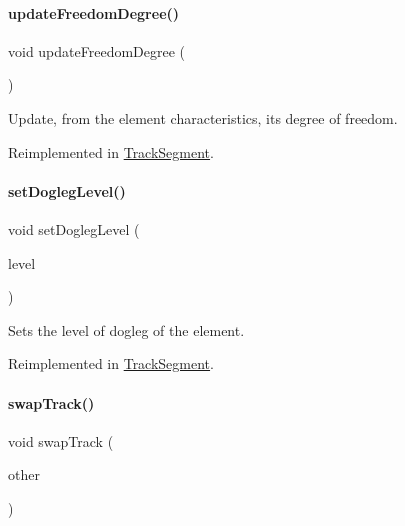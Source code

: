 \paragraph{\texorpdfstring{update\+Freedom\+Degree()}{updateFreedomDegree()}}
{\footnotesize\ttfamily void update\+Freedom\+Degree (\begin{DoxyParamCaption}{ }\end{DoxyParamCaption})\hspace{0.3cm}{\ttfamily [virtual]}}

Update, from the element characteristics, it\textquotesingle{}s degree of freedom. 

Reimplemented in \mbox{\hyperlink{classKite_1_1TrackSegment_af5332d647c0482aa90ad7cc9b2a50f3a}{Track\+Segment}}.

\mbox{\label{classKite_1_1TrackElement_a2b90319cb042b283aa5d1fdb1992f11f}} 
\paragraph{\texorpdfstring{set\+Dogleg\+Level()}{setDoglegLevel()}}
{\footnotesize\ttfamily void set\+Dogleg\+Level (\begin{DoxyParamCaption}\item[{unsigned int}]{level }\end{DoxyParamCaption})\hspace{0.3cm}{\ttfamily [virtual]}}

Sets the level of dogleg of the element. 

Reimplemented in \mbox{\hyperlink{classKite_1_1TrackSegment_a2b90319cb042b283aa5d1fdb1992f11f}{Track\+Segment}}.

\mbox{\label{classKite_1_1TrackElement_acc245ce084989d1c34816d0e61b9d510}} 
\paragraph{\texorpdfstring{swap\+Track()}{swapTrack()}}
{\footnotesize\ttfamily void swap\+Track (\begin{DoxyParamCaption}\item[{\mbox{\hyperlink{classKite_1_1TrackElement}{Track\+Element}} $\ast$}]{other }\end{DoxyParamCaption})\hspace{0.3cm}{\ttfamily [virtual]}}

